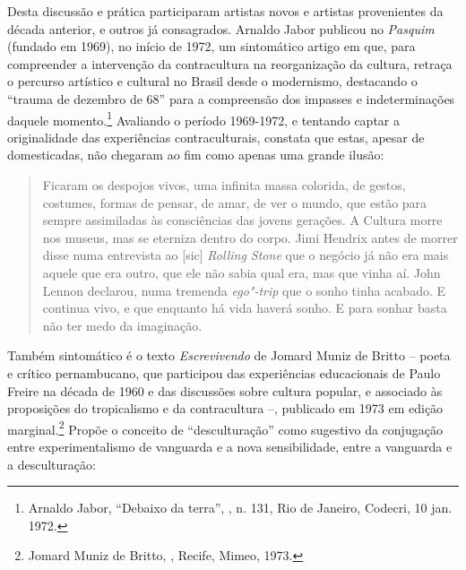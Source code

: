 Desta discussão e prática participaram artistas novos e artistas
provenientes da década anterior, e outros já consagrados. Arnaldo Jabor
publicou no \emph{Pasquim} (fundado em 1969), no início de 1972,
um sintomático artigo em que, para compreender a intervenção da
contracultura na reorganização da cultura, retraça o percurso artístico
e cultural no Brasil desde o modernismo, destacando o ``trauma de
dezembro de 68'' para a compreensão dos impasses e indeterminações
daquele momento.\footnote{Arnaldo Jabor, ``Debaixo da terra'', {},
 n. 131, Rio de Janeiro, Codecri, 10 jan. 1972.} Avaliando o
período 1969-1972, e tentando captar a originalidade das experiências
contraculturais, constata que estas, apesar de domesticadas, não
chegaram ao fim como apenas uma grande ilusão:

\begin{quote}
Ficaram os despojos vivos, uma infinita massa colorida, de gestos,
costumes, formas de pensar, de amar, de ver o mundo, que estão para
sempre assimiladas às consciências das jovens gerações. A Cultura morre
nos museus, mas se eterniza dentro do corpo. Jimi Hendrix antes de
morrer disse numa entrevista ao {[}sic{]} \emph{Rolling Stone} que o
negócio já não era mais aquele que era outro, que ele não sabia qual
era, mas que vinha aí. John Lennon declarou, numa tremenda
\emph{ego"-trip} que o sonho tinha acabado. E continua vivo, e que
enquanto há vida haverá sonho. E para sonhar basta não ter medo da
imaginação.
\end{quote}

Também sintomático é o texto \emph{Escrevivendo} de Jomard Muniz de
Britto -- poeta e crítico pernambucano, que participou das experiências
educacionais de Paulo Freire na década de 1960 e das discussões sobre
cultura popular, e associado às proposições do tropicalismo e da
contracultura --, publicado em 1973 em edição marginal.\footnote{Jomard
  Muniz de Britto, {}, Recife, Mimeo, 1973.} Propõe o
conceito de ``desculturação'' como sugestivo da conjugação entre
experimentalismo de vanguarda e a nova sensibilidade, entre a vanguarda
e a desculturação:

